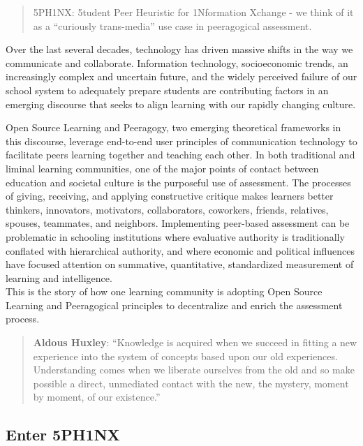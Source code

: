 \begin{quote}
5PH1NX: 5tudent Peer Heuristic for 1Nformation Xchange - we think of it
as a ``curiously trans-media'' use case in peeragogical assessment.
\end{quote}

Over the last several decades, technology has driven massive shifts in
the way we communicate and collaborate. Information technology,
socioeconomic trends, an increasingly complex and uncertain future, and
the widely perceived failure of our school system to adequately prepare
students are contributing factors in an emerging discourse that seeks to
align learning with our rapidly changing culture.

Open Source Learning and Peeragogy, two emerging theoretical frameworks
in this discourse, leverage end-to-end user principles of communication
technology to facilitate peers learning together and teaching each
other. In both traditional and liminal learning communities, one of the
major points of contact between education and societal culture is the
purposeful use of assessment. The processes of giving, receiving, and
applying constructive critique makes learners better thinkers,
innovators, motivators, collaborators, coworkers, friends, relatives,
spouses, teammates, and neighbors. Implementing peer-based assessment
can be problematic in schooling institutions where evaluative authority
is traditionally conflated with hierarchical authority, and where
economic and political influences have focused attention on summative,
quantitative, standardized measurement of learning and intelligence.\\[.2cm]

This is the story of how one learning community is adopting Open Source
Learning and Peeragogical principles to decentralize and enrich the
assessment process.

\begin{quote}
\textbf{Aldous Huxley}: ``Knowledge is acquired when we succeed in
fitting a new experience into the system of concepts based upon our old
experiences. Understanding comes when we liberate ourselves from the old
and so make possible a direct, unmediated contact with the new, the
mystery, moment by moment, of our existence.''
\end{quote}

\subsection{Enter 5PH1NX}\label{enter-5ph1nx}

